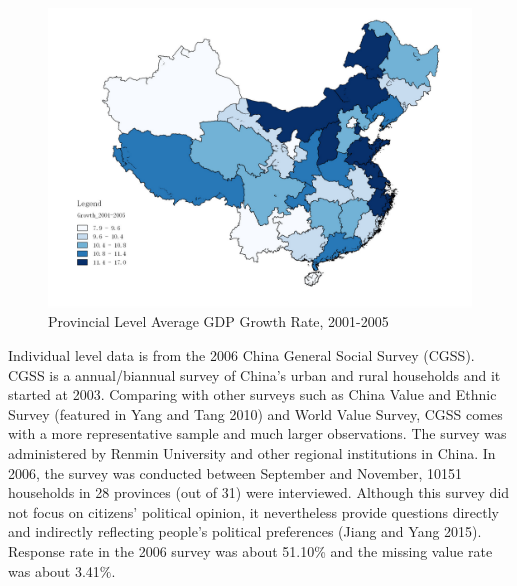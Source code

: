 \documentclass[12pt]{article}\usepackage[]{graphicx}\usepackage[]{color}
\begin{document}
\begin{figure}[H]
	\centering
	\includegraphics[width=1\textwidth]{growth}
	\caption{\label{growth} Provincial Level Average GDP Growth Rate, 2001-2005}
\end{figure}	


Individual level data is from the 2006 China General Social Survey (CGSS). CGSS is a annual/biannual survey of China's urban and rural households and it started at 2003. Comparing with other surveys such as China Value 
and Ethnic Survey (featured in Yang and Tang 2010) and World Value Survey, CGSS comes with a more representative sample and much larger observations. The survey was administered by Renmin University and other regional institutions in China. In 2006, the survey was conducted between September and November, 10151 households in 28 provinces (out of 31) were interviewed. Although this survey did not focus on citizens' political opinion, it nevertheless provide questions directly and indirectly reflecting people's political preferences (Jiang and Yang 2015). Response rate in the 2006 survey was about 51.10\% and the missing value rate was about 3.41$\%$.
\end{document}
